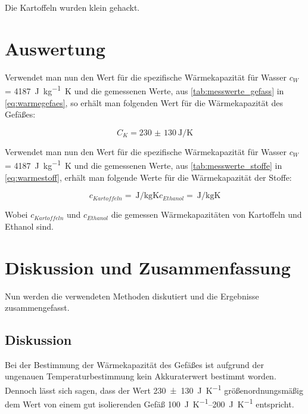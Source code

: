 \documentclass[11pt, ngerman]{scrartcl}
\begin{document}
Die Kartoffeln wurden klein gehackt.

\section{Auswertung}
\label{sec:auswertung}

Verwendet man nun den Wert für die spezifische Wärmekapazität für
Wasser $c_W$ = \SI{4187}{\joule\per\kg\kelvin} \cite{Ahrberg2011}
und die gemessenen Werte, aus \autoref{tab:messwerte_gefass} in \autoref{eq:warmegefaes}, so
erhält man folgenden Wert für die Wärmekapazität des
Gefäßes:

\begin{equation}
    C_K = \SI{230(130)}{\joule\per\kelvin}
\end{equation}

Verwendet man nun den Wert für die spezifische Wärmekapazität für
Wasser $c_W$ = \SI{4187}{\joule\per\kg\kelvin} \cite{Ahrberg2011}
und die gemessenen Werte, aus \autoref{tab:messwerte_stoffe} in \autoref{eq:warmestoff}, 
erhält man folgende Werte für die Wärmekapazität der
Stoffe:

\begin{equation}
    c_{Kartoffeln}   = \SI{}{\joule\per\kg\kelvin}
    c_{Ethanol} = \SI{}{\joule\per\kg\kelvin}
\end{equation}

Wobei $c_{Kartoffeln}$ und $c_{Ethanol}$ die gemessen
Wärmekapazitäten von Kartoffeln und Ethanol sind.


\section{Diskussion und Zusammenfassung}
\label{sec:diskussion_zusammenfassung}

Nun werden die verwendeten Methoden diskutiert und die Ergebnisse 
zusammengefasst.

\subsection{Diskussion}

Bei der Bestimmung der Wärmekapazität des Gefäßes 
ist aufgrund der ungenauen Temperaturbestimmung
kein Akkuraterwert bestimmt worden. Dennoch lässt
sich sagen, dass der Wert \SI{230(130)}{\joule\per\kelvin} größenordnungsmäßig
dem Wert von einem gut isolierenden Gefäß \SIrange{100}{200}{\joule\per\kelvin} \cite{wärmehinweise} entspricht. 
\end{document}

